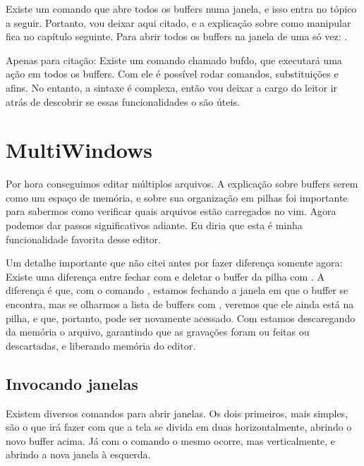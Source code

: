 Existe um comando que abre todos os buffers numa janela, e isso entra no tópico a seguir.
Portanto, vou deixar aqui citado, e a explicação sobre como manipular fica no capítulo seguinte.
Para abrir todos os buffers na janela de uma só vez: .


Apenas para citação: Existe um comando chamado bufdo, que executará uma ação em todos os buffers.
Com ele é possível rodar comandos, substituições e afins.
No entanto, a sintaxe é complexa, então vou deixar a cargo do leitor ir atrás de descobrir
se essas funcionalidades o são úteis.


\section{MultiWindows}
Por hora conseguimos editar múltiplos arquivos.
A explicação sobre buffers serem como um espaço de memória, e sobre sua organização em pilhas
foi importante para sabermos como verificar quais arquivos estão carregados no vim.
Agora podemos dar passos significativos adiante.
Eu diria que esta é minha funcionalidade favorita desse editor.

Um detalhe importante que não citei antes por fazer diferença somente agora:
Existe uma diferença entre fechar com  e deletar o buffer da pilha com .
A diferença é que, com o comando , estamos fechando a janela em que o buffer se encontra,
mas se olharmos a lista de buffers com , veremos que ele ainda está na pilha, e que,
portanto, pode ser novamente acessado.
Com  estamos descaregando da memória o arquivo, garantindo que as gravações foram ou feitas ou descartadas,
e liberando memória do editor.

\subsection{Invocando janelas}
Existem diversos comandos para abrir janelas.
Os dois primeiros, mais simples, são o  que irá fazer com que a tela
se divida em duas horizontalmente, abrindo o novo buffer acima.
Já com o comando  o mesmo ocorre, mas verticalmente, e abrindo a nova janela à esquerda.

